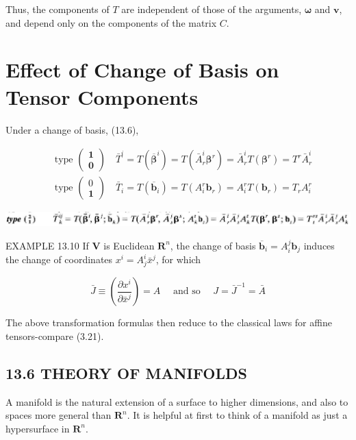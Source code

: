 \documentclass[10pt]{article}
\begin{document}
Thus, the components of $T$ are independent of those of the arguments, $\boldsymbol{\omega}$ and $\mathbf{v}$, and depend only on the components of the matrix $C$.

\section*{Effect of Change of Basis on Tensor Components}
Under a change of basis, (13.6),

$$
\begin{aligned}
& \text { type }\left(\begin{array}{l}
\mathbf{1} \\
\mathbf{0}
\end{array}\right) \quad \bar{T}^{i}=T\left(\overline{\boldsymbol{\beta}}^{i}\right)=T\left(\bar{A}_{r}^{i} \boldsymbol{\beta}^{r}\right)=\bar{A}_{r}^{i} T\left(\boldsymbol{\beta}^{r}\right)=T^{r} \bar{A}_{r}^{i} \\
& \text { type }\left(\begin{array}{l}
0 \\
\mathbf{1}
\end{array}\right) \quad \bar{T}_{i}=T\left(\overline{\mathbf{b}}_{i}\right)=T\left(A_{i}^{r} \mathbf{b}_{r}\right)=A_{i}^{r} T\left(\mathbf{b}_{r}\right)=T_{r} A_{i}^{r}
\end{aligned}
$$

\begin{center}
\includegraphics[max width=\textwidth]{2024_04_03_41f90be4f896e21f0dc9g-203}
\end{center}

EXAMPLE 13.10 If $\mathbf{V}$ is Euclidean $\mathbf{R}^{n}$, the change of basis $\overline{\mathbf{b}}_{i}=A_{i}^{j} \mathbf{b}_{j}$ induces the change of coordinates $x^{i}=A_{j}^{i} \bar{x}^{j}$, for which

$$
\bar{J} \equiv\left(\frac{\partial x^{i}}{\partial \bar{x}^{j}}\right)=A \quad \text { and so } \quad J=\bar{J}^{-1}=\bar{A}
$$

The above transformation formulas then reduce to the classical laws for affine tensors-compare (3.21).

\subsection*{13.6 THEORY OF MANIFOLDS}
A manifold is the natural extension of a surface to higher dimensions, and also to spaces more general than $\mathbf{R}^{n}$. It is helpful at first to think of a manifold as just a hypersurface in $\mathbf{R}^{n}$.
\end{document}
